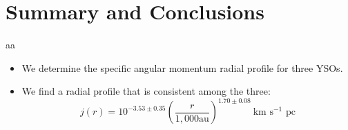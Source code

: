 \section{Summary and Conclusions}
aa
\begin{itemize}
\item We determine the specific angular momentum radial profile for three YSOs. 
\item We find a radial profile that is consistent among the three:
\[ j(r) = 10^{-3.53\pm0.35}\left( \frac{r}{1,000 \textrm{au}}\right)^{1.70\pm 0.08}~\textrm{km s$^{-1}$ pc}\]
\end{itemize}
  
  
  